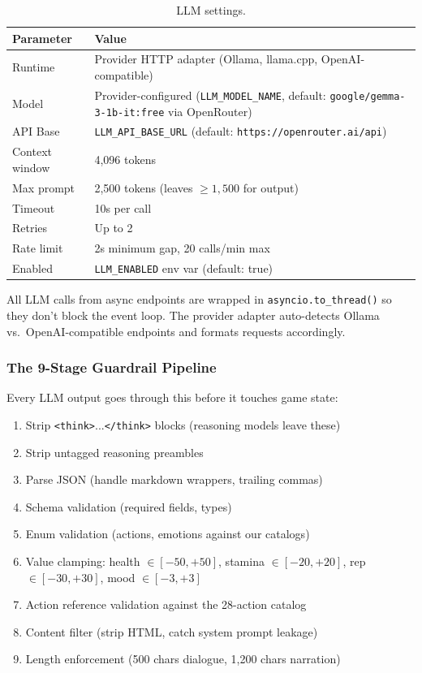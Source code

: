 \begin{table}[ht]
\centering
\caption{LLM settings.}
\label{tab:llm}
\begin{tabular}{@{}ll@{}}
\toprule
Parameter & Value \\
\midrule
Runtime & Provider HTTP adapter (Ollama, llama.cpp, OpenAI-compatible) \\
Model & Provider-configured (\texttt{LLM\_MODEL\_NAME}, default: \texttt{google/gemma-3-1b-it:free} via OpenRouter) \\
API Base & \texttt{LLM\_API\_BASE\_URL} (default: \texttt{https://openrouter.ai/api}) \\
Context window & 4,096 tokens \\
Max prompt & 2,500 tokens (leaves $\geq 1,500$ for output) \\
Timeout & 10s per call \\
Retries & Up to 2 \\
Rate limit & 2s minimum gap, 20 calls/min max \\
Enabled & \texttt{LLM\_ENABLED} env var (default: true) \\
\bottomrule
\end{tabular}
\end{table}

All LLM calls from async endpoints are wrapped in \texttt{asyncio.to\_thread()} so they don't block the event loop. The provider adapter auto-detects Ollama vs.\ OpenAI-compatible endpoints and formats requests accordingly.

\subsubsection{The 9-Stage Guardrail Pipeline}

Every LLM output goes through this before it touches game state:

\begin{enumerate}
    \item Strip \texttt{<think>}...\texttt{</think>} blocks (reasoning models leave these)
    \item Strip untagged reasoning preambles
    \item Parse JSON (handle markdown wrappers, trailing commas)
    \item Schema validation (required fields, types)
    \item Enum validation (actions, emotions against our catalogs)
    \item Value clamping: health $\in [-50, +50]$, stamina $\in [-20, +20]$, rep $\in [-30, +30]$, mood $\in [-3, +3]$
    \item Action reference validation against the 28-action catalog
    \item Content filter (strip HTML, catch system prompt leakage)
    \item Length enforcement (500 chars dialogue, 1,200 chars narration)
\end{enumerate}

